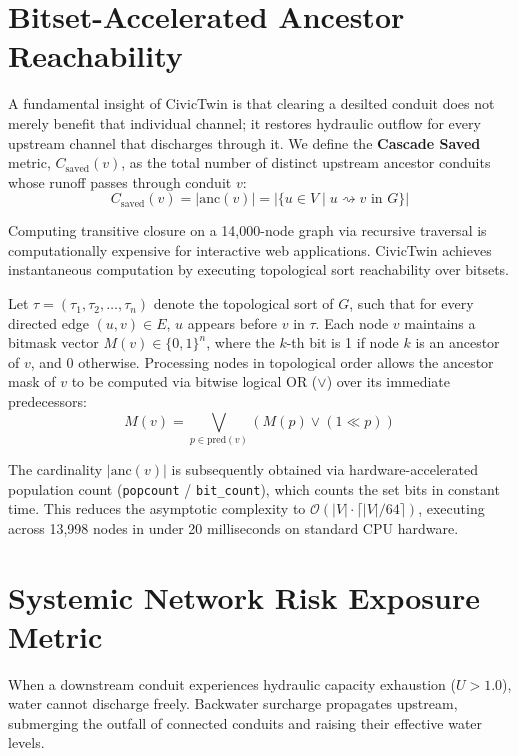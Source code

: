 \documentclass[12pt,a4paper]{report}
\begin{document}
\section{Bitset-Accelerated Ancestor Reachability}
A fundamental insight of CivicTwin is that clearing a desilted conduit does not merely benefit that individual channel; it restores hydraulic outflow for every upstream channel that discharges through it. We define the \textbf{Cascade Saved} metric, $C_{\text{saved}}(v)$, as the total number of distinct upstream ancestor conduits whose runoff passes through conduit $v$:
\begin{equation}
C_{\text{saved}}(v) = |\text{anc}(v)| = |\{u \in V \mid u \rightsquigarrow v \text{ in } G\}|
\label{eqn:cascade_saved}
\end{equation}

Computing transitive closure on a 14,000-node graph via recursive traversal is computationally expensive for interactive web applications. CivicTwin achieves instantaneous computation by executing topological sort reachability over bitsets. 

Let $\tau = (\tau_1, \tau_2, \dots, \tau_n)$ denote the topological sort of $G$, such that for every directed edge $(u, v) \in E$, $u$ appears before $v$ in $\tau$. Each node $v$ maintains a bitmask vector $M(v) \in \{0, 1\}^n$, where the $k$-th bit is 1 if node $k$ is an ancestor of $v$, and 0 otherwise. Processing nodes in topological order allows the ancestor mask of $v$ to be computed via bitwise logical OR ($\lor$) over its immediate predecessors:
\begin{equation}
M(v) = \bigvee_{p \in \text{pred}(v)} \left(M(p) \lor (1 \ll p)\right)
\label{eqn:bitset_or}
\end{equation}

The cardinality $|\text{anc}(v)|$ is subsequently obtained via hardware-accelerated population count (\texttt{popcount} / \texttt{bit\_count}), which counts the set bits in constant time. This reduces the asymptotic complexity to $\mathcal{O}(|V| \cdot \lceil |V| / 64 \rceil)$, executing across 13,998 nodes in under 20 milliseconds on standard CPU hardware.

\section{Systemic Network Risk Exposure Metric}
When a downstream conduit experiences hydraulic capacity exhaustion ($U > 1.0$), water cannot discharge freely. Backwater surcharge propagates upstream, submerging the outfall of connected conduits and raising their effective water levels. 
\end{document}
